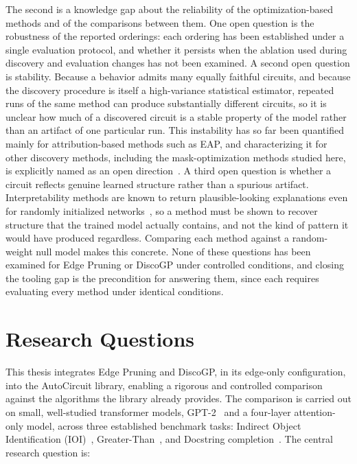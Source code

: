 The second is a knowledge gap about the reliability of the optimization-based methods and of the comparisons between them. One open question is the robustness of the reported orderings: each ordering has been established under a single evaluation protocol, and whether it persists when the ablation used during discovery and evaluation changes has not been examined. A second open question is stability. Because a behavior admits many equally faithful circuits, and because the discovery procedure is itself a high-variance statistical estimator, repeated runs of the same method can produce substantially different circuits, so it is unclear how much of a discovered circuit is a stable property of the model rather than an artifact of one particular run. This instability has so far been quantified mainly for attribution-based methods such as EAP, and characterizing it for other discovery methods, including the mask-optimization methods studied here, is explicitly named as an open direction~\citep{meloux2025variance}. A third open question is whether a circuit reflects genuine learned structure rather than a spurious artifact. Interpretability methods are known to return plausible-looking explanations even for randomly initialized networks~\citep{meloux2025deadsalmons}, so a method must be shown to recover structure that the trained model actually contains, and not the kind of pattern it would have produced regardless. Comparing each method against a random-weight null model makes this concrete. None of these questions has been examined for Edge Pruning or DiscoGP under controlled conditions, and closing the tooling gap is the precondition for answering them, since each requires evaluating every method under identical conditions.

\section{Research Questions}\label{sec:rqs}

This thesis integrates Edge Pruning and DiscoGP, in its edge-only configuration, into the AutoCircuit library, enabling a rigorous and controlled comparison against the algorithms the library already provides. The comparison is carried out on small, well-studied transformer models, GPT-2~\citep{gpt2} and a four-layer attention-only model, across three established benchmark tasks: Indirect Object Identification (IOI)~\citep{wang2023interpretability}, Greater-Than~\citep{hanna2023doesgpt2computegreaterthan}, and Docstring completion~\citep{stefanhex_janiak_2023}. The central research question is:

